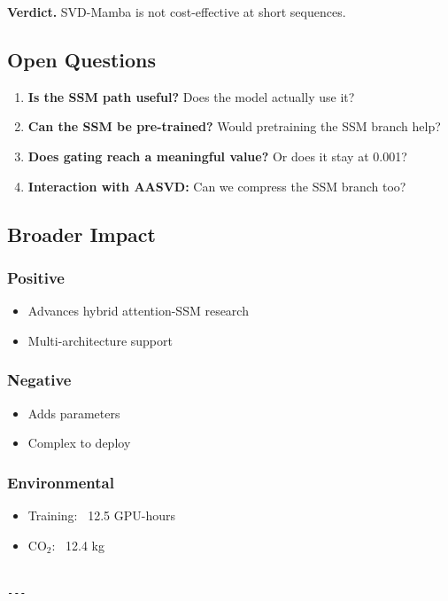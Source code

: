 \textbf{Verdict.} SVD-Mamba is not cost-effective at short sequences.

\subsection{Open Questions}

\begin{enumerate}
\item \textbf{Is the SSM path useful?} Does the model actually use it?
\item \textbf{Can the SSM be pre-trained?} Would pretraining the SSM branch
  help?
\item \textbf{Does gating reach a meaningful value?} Or does it stay at 0.001?
\item \textbf{Interaction with AASVD:} Can we compress the SSM branch too?

\end{enumerate}
\subsection{Broader Impact}

\subsubsection{Positive}
\begin{itemize}
\item Advances hybrid attention-SSM research
\item Multi-architecture support

\end{itemize}
\subsubsection{Negative}
\begin{itemize}
\item Adds parameters
\item Complex to deploy

\end{itemize}
\subsubsection{Environmental}
\begin{itemize}
\item Training: ~12.5 GPU-hours
\item CO$_2$: ~12.4 kg
\end{itemize}
\begin{lstlisting}

---
\end{lstlisting}


